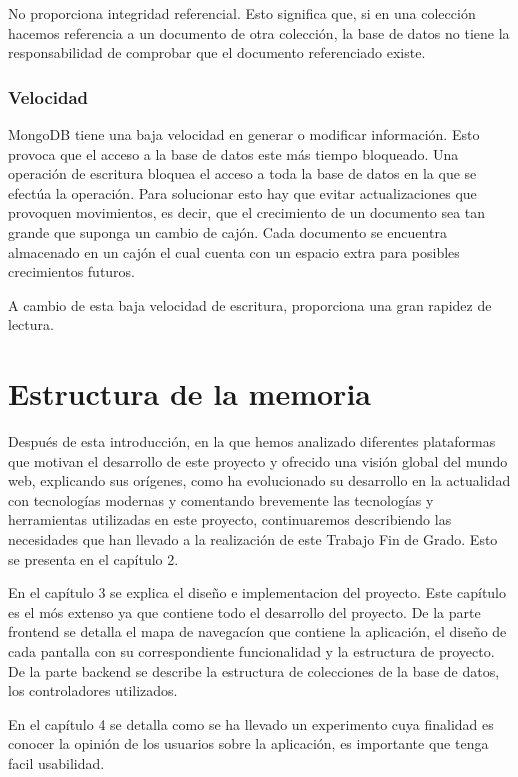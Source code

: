 \documentclass[a4paper, 12pt]{book}
\begin{document}
No proporciona integridad referencial. Esto significa que, si en una colecci\'on hacemos referencia
a un documento de otra colecci\'on, la base de datos no tiene la responsabilidad de comprobar
que el documento referenciado existe.


\subsubsection{Velocidad}
\label{subsec:estilo}

MongoDB tiene una baja velocidad en generar o modificar informaci\'on. Esto provoca que
el acceso a la base de datos este m\'as tiempo bloqueado. Una operaci\'on de escritura bloquea el
acceso a toda la base de datos en la que se efect\'ua la operaci\'on. Para solucionar esto hay que
evitar actualizaciones que provoquen movimientos, es decir, que el crecimiento de un documento
sea tan grande que suponga un cambio de caj\'on. Cada documento se encuentra almacenado
en un caj\'on el cual cuenta con un espacio extra para posibles crecimientos futuros.

A cambio de esta baja velocidad de escritura, proporciona una gran rapidez de lectura.


\section{Estructura de la memoria}
\label{sec:estructura}

Despu\'es de esta introducci\'on, en la que hemos analizado diferentes plataformas que motivan
el desarrollo de este proyecto y ofrecido una visi\'on global del mundo web, explicando
sus or\'igenes, como ha evolucionado su desarrollo en la actualidad con tecnolog\'ias modernas
y comentando brevemente las tecnolog\'ias y herramientas utilizadas en este proyecto, continuaremos
describiendo las necesidades que han llevado a la realizaci\'on de este Trabajo Fin
de Grado. Esto se presenta en el cap\'itulo 2.

En el cap\'itulo 3 se explica el dise\~no e implementacion del proyecto. Este cap\'itulo es el m\'os extenso ya que contiene todo 
el desarrollo del proyecto. De la parte frontend se detalla el mapa de navegac\'ion que contiene la aplicaci\'on, el dise\~no de cada pantalla con su correspondiente funcionalidad y la 
estructura de proyecto. De la parte backend se describe la estructura de colecciones de la base de datos,
los controladores utilizados.

En el cap\'itulo 4 se detalla como se ha llevado un experimento cuya finalidad es conocer la opini\'on de los usuarios sobre la aplicaci\'on, es importante
que tenga facil usabilidad.
\end{document}
